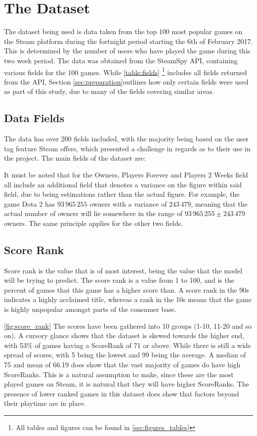 \documentclass[dataset.tex]{subfiles}
\begin{document}
\section{The Dataset} %
\label{sec:dataset}
The dataset being used is data taken from the top 100 most popular games on the
Steam platform during the fortnight period starting the 6th of February 2017.
This is determined by the number of users who have played the game during this
two week period. The data was obtained from the SteamSpy API, containing various
fields for the 100 games. While \autoref{table:fields} \footnote{All tables
and figures can be found in \autoref{sec:figures_tables}} includes all fields
returned from the API, Section \autoref{sec:preparation}outlines how only certain
fields were used as part of this study, due to many of the fields covering
similar areas.

\subsection{Data Fields} %
\label{sub:data_fields}
The data has over 200 fields included, with the majority being based on the user
tag feature Steam offers, which presented a challenge in regards as to their use
in the project. The main fields of the dataset are:

It must be noted that for the Owners, Players Forever and Players 2 Weeks field
all include an additional field that denotes a variance on the figure within
said field, due to being estimations rather than the actual figure. For example,
the game Dota 2 has \(93\,965\,255\) owners with a variance of \(243\,479\),
meaning that the actual number of owners will lie somewhere in the range of
\(93\,965\,255 \pm 243\,479 \) owners. The same principle applies for the other
two fields.

\subsection{Score Rank} %
\label{sub:score_rank}
Score rank is the value that is of most interest, being the value that the model
will be trying to predict. The score rank is a value from 1 to 100, and is the
percent of games that this game has a higher score than. A score rank in the 90s
indicates a highly acclaimed title, whereas a rank in the 10s means that the
game is highly unpopular amongst parts of the consumer base. 

\autoref{fig:score_rank}
The scores have been gathered into 10 groups (1-10, 11-20 and so on). A cursory
glance shows that the dataset is skewed towards the higher end, with 53\% of
games having a ScoreRank of 71 or above. While there is still a wide spread of
scores, with 5 being the lowest and 99 being the average. A median of 75 and
mean of 66.19 does show that the vast majority of games do have high ScoreRanks.
This is a natural assumption to make, since these are the most played games on
Steam, it is natural that they will have higher ScoreRanks. The presence of
lower ranked games in this dataset does show that factors beyond their playtime
are in place.
\end{document}
